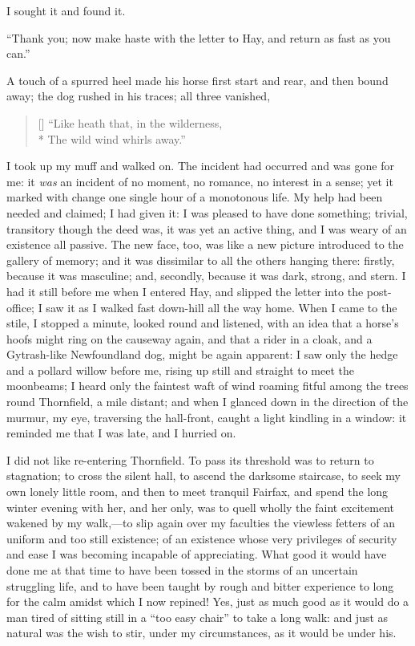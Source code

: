I sought it and found it.

\enquote{Thank you; now make haste with the letter to Hay, and return as
fast as you can.}

A touch of a spurred heel made his horse first start and rear, and then
bound away; the dog rushed in his traces; all three vanished,

\begin{verse}[\versewidth]
\enquote{Like heath that, in the wilderness,\\*
The wild wind whirls away.}
\end{verse}

I took up my muff and walked on. The incident had occurred and was gone
for me: it \emph{was} an incident of no moment, no romance, no interest
in a sense; yet it marked with change one single hour of a monotonous
life. My help had been needed and claimed; I had given it: I was
pleased to have done something; trivial, transitory though the deed was,
it was yet an active thing, and I was weary of an existence all
passive. The new face, too, was like a new picture introduced to the
gallery of memory; and it was dissimilar to all the others hanging
there: firstly, because it was masculine; and, secondly, because it was
dark, strong, and stern. I had it still before me when I entered Hay,
and slipped the letter into the post-office; I saw it as I walked fast
down-hill all the way home. When I came to the stile, I stopped a
minute, looked round and listened, with an idea that a horse's hoofs
might ring on the causeway again, and that a rider in a cloak, and a
Gytrash-like Newfoundland dog, might be again apparent: I saw only the
hedge and a pollard willow before me, rising up still and straight to
meet the moonbeams; I heard only the faintest waft of wind roaming
fitful among the trees round Thornfield, a mile distant; and when I
glanced down in the direction of the murmur, my eye, traversing the
hall-front, caught a light kindling in a window: it reminded me that I
was late, and I hurried on.

I did not like re-entering Thornfield. To pass its threshold was to
return to stagnation; to cross the silent hall, to ascend the darksome
staircase, to seek my own lonely little room, and then to meet tranquil
\Mrs{} Fairfax, and spend the long winter evening with her, and her only,
was to quell wholly the faint excitement wakened by my walk,---to slip
again over my faculties the viewless fetters of an uniform and too still
existence; of an existence whose very privileges of security and ease I
was becoming incapable of appreciating. What good it would have done me
at that time to have been tossed in the storms of an uncertain
struggling life, and to have been taught by rough and bitter experience
to long for the calm amidst which I now repined! Yes, just as much good
as it would do a man tired of sitting still in a \enquote{too easy
chair} to take a long walk: and just as natural was the wish to stir,
under my circumstances, as it would be under his.

